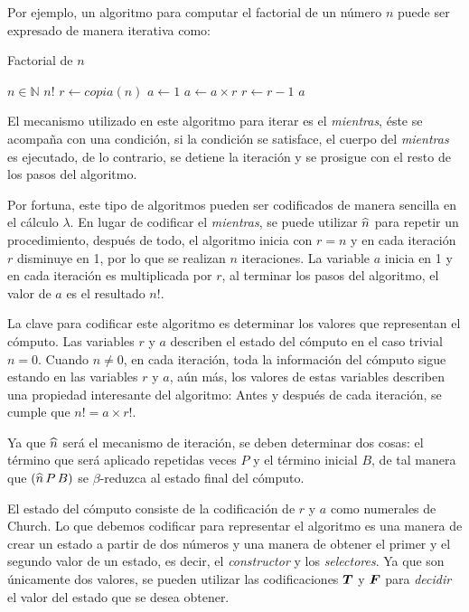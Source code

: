 Por ejemplo, un algoritmo para computar el factorial de un número \( n \) puede ser expresado de manera iterativa como:

\begin{algorithm}
  \caption{Factorial de \( n \)}
  \label{alg:factorial}
  \begin{algorithmic}
    \REQUIRE \( n \in \mathbb{N} \)
    \ENSURE \( n! \)
    \STATE \( r \leftarrow copia(n) \)
    \STATE \( a \leftarrow 1 \)
    \STATE \( a \leftarrow a \times r \)
    \STATE \( r \leftarrow r - 1 \)
    \ENDWHILE
    \RETURN \( a \)
  \end{algorithmic}
\end{algorithm}

El mecanismo utilizado en este algoritmo para iterar es el \emph{mientras}, éste se acompaña con una condición, si la condición se satisface, el cuerpo del \emph{mientras} es ejecutado, de lo contrario, se detiene la iteración y se prosigue con el resto de los pasos del algoritmo.

Por fortuna, este tipo de algoritmos pueden ser codificados de manera sencilla en el cálculo \( λ \). En lugar de codificar el \emph{mientras}, se puede utilizar \( \widehat{n} \) para repetir un procedimiento, después de todo, el algoritmo inicia con \( r = n \) y en cada iteración \( r \) disminuye en 1, por lo que se realizan \( n \) iteraciones. La variable \( a \) inicia en 1 y en cada iteración es multiplicada por \( r \), al terminar los pasos del algoritmo, el valor de \( a \) es el resultado \( n! \).

La clave para codificar este algoritmo es determinar los valores que representan el cómputo. Las variables \( r \) y \( a \) describen el estado del cómputo en el caso trivial \( n = 0 \). Cuando \( n \not= 0 \), en cada iteración, toda la información del cómputo sigue estando en las variables \( r \) y \( a \), aún más, los valores de estas variables describen una propiedad interesante del algoritmo: Antes y después de cada iteración, se cumple que \( n! = a \times r! \).

Ya que \( \widehat{n} \) será el mecanismo de iteración, se deben determinar dos cosas: el término que será aplicado repetidas veces \( P \) y el término inicial \( B \), de tal manera que \( (\widehat{n}\, P\, B) \) se \( β \)-reduzca al estado final del cómputo.

El estado del cómputo consiste de la codificación de \( r \) y \( a \) como numerales de Church. Lo que debemos codificar para representar el algoritmo es una manera de crear un estado a partir de dos números y una manera de obtener el primer y el segundo valor de un estado, es decir, el \emph{constructor} y los \emph{selectores}. Ya que son únicamente dos valores, se pueden utilizar las codificaciones \( \boldsymbol{T} \) y \( \boldsymbol{F} \) para \emph{decidir} el valor del estado que se desea obtener.

